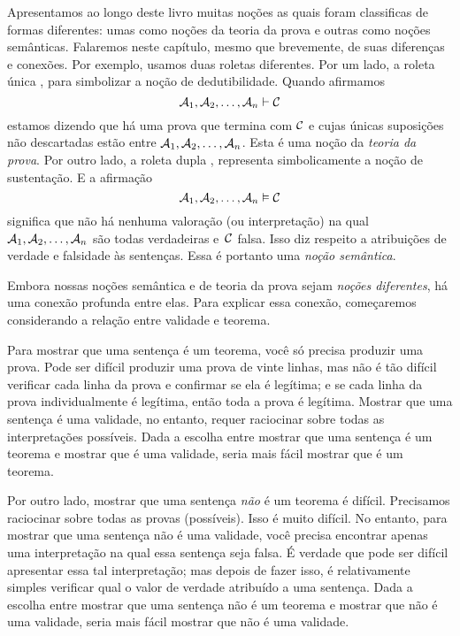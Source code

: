 Apresentamos ao longo deste livro muitas no\c c\~oes as quais foram classificas de formas diferentes: umas como no\c c\~oes da teoria da prova e outras como  no\c c\~oes sem\^anticas.  Falaremos neste cap\'itulo, mesmo que brevemente, de suas diferen\c cas  e conex\~oes. 
Por exemplo, usamos duas roletas diferentes.  Por um lado, a roleta \'unica  \proves,  para simbolizar a no\c c\~ao de dedutibilidade. Quando afirmamos 
$$\mathcal{A}_1, \mathcal{A}_2, \ldots, \mathcal{A}_n \vdash \mathcal{C}$$
estamos dizendo que h\'a uma prova que termina com $\mathcal{C}$ e cujas \'unicas suposi\c c\~oes n\~ao descartadas est\~ao entre  $\mathcal{A}_1, \mathcal{A}_2, \ldots, \mathcal{A}_n$. Esta \'e uma no\c c\~ao da \emph{teoria da prova}.   Por outro lado,  a roleta  dupla  \entails, representa simbolicamente a no\c c\~ao de sustenta\c c\~ao. E a afirma\c c\~ao 
$$\mathcal{A}_1, \mathcal{A}_2, \ldots, \mathcal{A}_n \vDash \mathcal{C}$$
significa que n\~ao h\'a nenhuma valora\c c\~ao (ou interpreta\c c\~ao) na qual  $\mathcal{A}_1, \mathcal{A}_2, \ldots, \mathcal{A}_n$ s\~ao todas verdadeiras e~$\mathcal{C}$ falsa. Isso diz respeito a atribui\c c\~oes de verdade e falsidade \`as senten\c cas. Essa \'e portanto uma \emph{no\c c\~ao sem\^antica}.

Embora nossas no\c c\~oes sem\^antica e de teoria da prova sejam \emph{no\c c\~oes diferentes}, h\'a uma conex\~ao profunda entre elas. Para explicar essa conex\~ao, come\c caremos considerando a rela\c c\~ao entre validade  e teorema.

Para mostrar que uma senten\c ca \'e um teorema, voc\^e s\'o precisa produzir uma prova. Pode ser dif\'icil produzir uma prova de vinte linhas, mas n\~ao \'e t\~ao dif\'icil verificar cada linha da prova e confirmar se ela \'e leg\'itima; e se cada linha da prova individualmente \'e leg\'itima, ent\~ao toda a prova \'e leg\'itima. Mostrar que uma senten\c ca \'e uma validade, no entanto, requer raciocinar sobre todas as interpreta\c c\~oes poss\'iveis. Dada a escolha entre mostrar que uma senten\c ca \'e um teorema e mostrar que \'e uma validade, seria mais f\'acil mostrar que \'e um teorema.

Por outro lado, mostrar que uma senten\c ca \emph{n\~ao} \'e um teorema \'e dif\'icil. Precisamos raciocinar sobre todas as provas (poss\'iveis). Isso \'e muito dif\'icil. No entanto, para mostrar que uma senten\c ca n\~ao \'e uma validade, voc\^e precisa encontrar apenas uma interpreta\c c\~ao na qual essa senten\c ca seja falsa. \'E verdade que pode ser dif\'icil apresentar essa tal interpreta\c c\~ao; mas depois de fazer isso, \'e relativamente simples verificar qual o valor de verdade atribu\'ido a uma senten\c ca. Dada a escolha entre mostrar que uma senten\c ca n\~ao \'e um teorema e mostrar que n\~ao \'e uma validade, seria mais f\'acil mostrar que n\~ao \'e uma validade.

